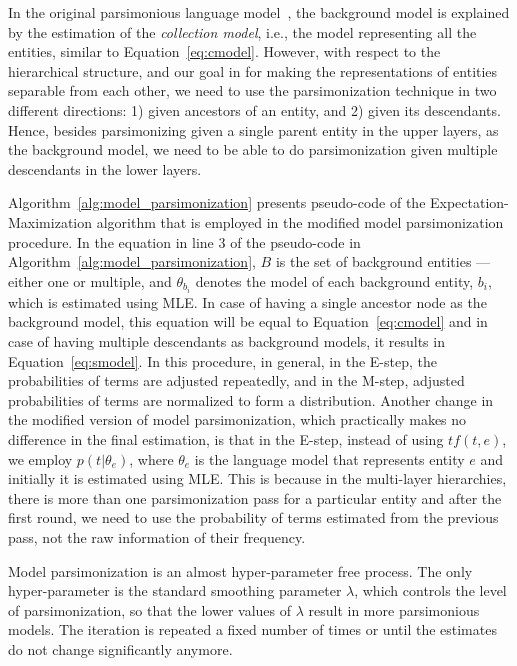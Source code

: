 In the original parsimonious language model~\citep{Hiemstra:2004}, the background model is explained by the estimation of the \emph{collection model}, i.e., the model representing all the entities, similar to Equation~\ref{eq:cmodel}.  
However, with respect to the hierarchical structure, and our goal in \achswlm for making the representations of entities separable from each other, we need to use the parsimonization technique in two different directions: 1) given ancestors of an entity, and 2) given its descendants. Hence, besides parsimonizing given a single parent entity in the upper layers, as the background model, we need to be able to do parsimonization given multiple descendants in the lower layers. 

Algorithm~\ref{alg:model_parsimonization} presents pseudo-code of the Expectation-Maximization algorithm that is employed in the modified model parsimonization procedure. 
In the equation in line 3 of the pseudo-code in Algorithm~\ref{alg:model_parsimonization}, $B$ is the set of background entities ---either one or multiple, and $\theta_{b_i}$ denotes the model of each background entity, $b_i$, which is estimated using MLE. In case of having a single ancestor node as the background model,  this equation will be equal to Equation~\ref{eq:cmodel} and in case of having multiple descendants as background models, it results in Equation~\ref{eq:smodel}. 
In this procedure, in general, in the E-step, the probabilities of terms are adjusted repeatedly, and in the M-step, adjusted probabilities of terms are normalized to form a distribution. 
Another change in the modified version of model parsimonization, which practically makes no difference in the final estimation, is that in the E-step, instead of using $tf(t,e)$, we employ $p(t|\theta_e)$, where $\theta_e$ is the language model that represents entity $e$ and initially it is estimated using MLE. This is because in the multi-layer hierarchies, there is more than one parsimonization pass for a particular entity and after the first round, we need to use the probability of terms estimated from the previous pass, not the raw information of their frequency.


Model parsimonization is an almost hyper-parameter free process. The only hyper-parameter is the standard smoothing parameter $\lambda$, which controls the level of parsimonization, so that the lower values of $\lambda$ result in more parsimonious models.
The iteration is repeated a fixed number of times or until the estimates do not change significantly anymore. 

